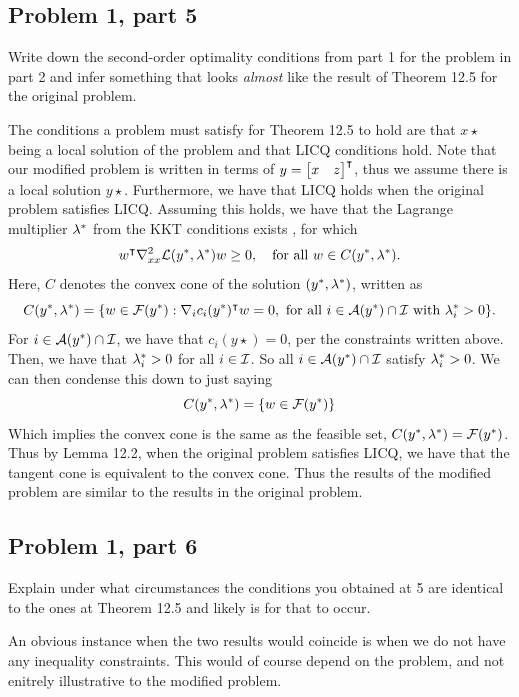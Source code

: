 \subsection{Problem 1, part 5}
Write down the second-order optimality conditions from part 1 for the problem in part 2 and infer something that looks \textit{almost} like the result of Theorem 12.5 for the original problem. 
\partbreak
\begin{solution}

    The conditions a problem must satisfy for Theorem 12.5 to hold are that $x\star$ being a local solution of the problem and that LICQ conditions hold. Note that our modified problem is written in terms of $y = \mqty[x&z]\T$, thus we assume there is a local solution $y\star$. Furthermore, we have that LICQ holds when the original problem satisfies LICQ. Assuming this holds, we have that the Lagrange multiplier $\mathrm{\lambda}^*$ from the KKT conditions exists , for which
    \[w^\intercal \nabla_{xx}^2\mathcal{L}(y^*, \mathrm{\lambda}^*)w \geq 0 ,\quad \text{for all } w \in C(y^*, \mathrm{\lambda}^*).\]
    Here, $C$ denotes the convex cone of the solution $(y^*, \mathrm{\lambda}^*)$, written as
    \[C(y^*, \mathrm{\lambda}^*) = \{ w \in \mathcal{F}(y^*) : \nabla_ic_i(y^*)^\intercal w = 0, \text{ for all } i \in \mathcal{A}(y^*) \cap \mathcal{I} \text{ with } \mathrm{\lambda}_i^* > 0\}.\]
    For $i \in \mathcal{A}(y^*) \cap \mathcal{I}$, we have that $c_i(y\star) = 0$, per the constraints written above. Then, we have that $\mathrm{\lambda}_i^* > 0$ for all $i \in \mathcal{I}$. So all $i \in \mathcal{A}(y^*) \cap \mathcal{I}$ satisfy $\mathrm{\lambda}_i^* > 0$. We can then condense this down to just saying
    \[C(y^*, \mathrm{\lambda}^*) = \{ w \in \mathcal{F}(y^*)\}\]
    Which implies the convex cone is the same as the feasible set, $C(y^*, \mathrm{\lambda}^*) = \mathcal{F}(y^*)$. Thus by Lemma 12.2, when the original problem satisfies LICQ, we have that the tangent cone is equivalent to the convex cone. Thus the results of the modified problem are similar to the results in the original problem.  
\end{solution}

\newpage
\subsection{Problem 1, part 6}
Explain under what circumstances the conditions you obtained at 5 are identical to the ones at Theorem 12.5 and likely is for that to occur. 
\partbreak
\begin{solution}

    An obvious instance when the two results would coincide is when we do not have any inequality constraints. This would of course depend on the problem, and not enitrely illustrative to the modified problem. 
\end{solution}
\newpage
